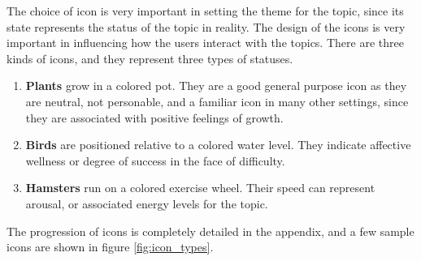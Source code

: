       The choice of icon is very important in setting
      the theme for the topic, since its state represents the status of the topic
      in reality.
      The design of the icons is very important in influencing how
      the users interact with the topics. 
      There are three kinds of icons, and they represent three types of statuses.
      \begin{enumerate}
      \item \textbf{Plants} grow in a colored pot. They are a good general purpose icon as they are neutral,
      not personable, and a familiar icon in many other settings,
      since they are associated with positive feelings of growth.
      \item \textbf{Birds} are positioned relative to a colored water level.
      They indicate affective wellness or degree of success in the face of difficulty.
      \item \textbf{Hamsters} run on a colored exercise wheel.
      Their speed can represent arousal,
      or associated energy levels for the topic.
      \end{enumerate}
      The progression of icons is completely detailed in the appendix,
      and a few sample icons are shown in figure \ref{fig:icon_types}.

